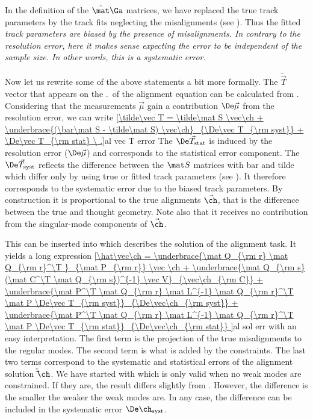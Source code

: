 \> In the definition of the $\hat\mat\Ga$ matrices, we have replaced the true track parameters by the track fits neglecting the misalignments (see ). Thus the fitted \em{track parameters are biased} by the presence of misalignments. In contrary to the resolution error, here it makes sense expecting the error to be independent of the sample size. In other words, this is a  \em{systematic error}.

Now let us rewrite some of the above statements a bit more formally. The $\tilde\vec T$ vector that appears on the \rhs.~of the alignment equation  can be calculated from . Considering that the measurements $\vec\mu$ gain a contribution $\De\vec\mu$ from the resolution error, we can write
\eqref{\tilde\vec T =
	\tilde\mat S \vec\ch
	+ \underbrace{(\bar\mat S - \tilde\mat S) \vec\ch}_{\De\vec T_{\rm syst}}
	+ \De\vec T_{\rm stat}
\ .}{al vec T error}
The $\De\vec T_{\rm stat}$ is induced by the resolution error ($\De\vec\mu$) and corresponds to the statistical error component. The $\De\vec T_{\rm syst}$ reflects the difference between the $\mat S$ matrices with bar and tilde which differ only by using true or fitted track parameters (see ). It therefore corresponds to the systematic error due to the biased track parameters. By construction it is proportional to the true alignments $\vec\ch$, that is the difference between the true and thought geometry. Note also that it receives no contribution from the singular-mode components of $\vec\ch$.

This can be inserted into  which describes the solution of the alignment task. It yields a long expression
\eqref{\hat\vec\ch =
	\underbrace{\mat Q_{\rm r} \mat Q_{\rm r}^\T }_{\mat P_{\rm r}} \vec \ch
	+ \underbrace{\mat Q_{\rm s} (\mat C^\T \mat Q_{\rm s})^{-1} \vec V}_{\vec\ch_{\rm C}}
	+ \underbrace{\mat P^\T \mat Q_{\rm r} \mat L^{-1} \mat Q_{\rm r}^\T \mat P \De\vec T_{\rm syst}}_{\De\vec\ch_{\rm syst}}
	+ \underbrace{\mat P^\T \mat Q_{\rm r} \mat L^{-1} \mat Q_{\rm r}^\T \mat P \De\vec T_{\rm stat}}_{\De\vec\ch_{\rm stat}}
}{al sol err}
with an easy interpretation. The first term is the projection of the true misalignments to the regular modes. The second term is what is added by the constraints. The last two terms correspond to the systematic and statistical errors of the alignment solution $\hat\vec\ch$. We have started with  which is only valid when no weak modes are constrained. If they are, the result differs slightly from . However, the difference is the smaller the weaker the weak modes are. In any case, the difference can be included in the systematic error $\De\ch_{\rm syst}$.

